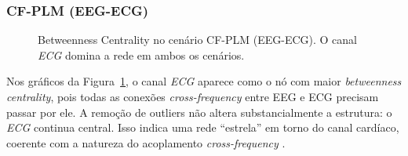 \subsubsection{CF-PLM (EEG-ECG)}
\begin{figure}[htb]
    \centering
    \quad
    \caption{Betweenness Centrality no cenário CF-PLM (EEG-ECG). O canal \emph{ECG} domina a rede em ambos os cenários.}
    \label{fig:bc_cfplm_eegecg}
\end{figure}

Nos gráficos da Figura~\ref{fig:bc_cfplm_eegecg}, o canal \emph{ECG} aparece como o nó com maior \emph{betweenness centrality}, pois todas as conexões \emph{cross-frequency} entre EEG e ECG precisam passar por ele. A remoção de outliers não altera substancialmente a estrutura: o \emph{ECG} continua central. Isso indica uma rede “estrela” em torno do canal cardíaco, coerente com a natureza do acoplamento \emph{cross-frequency} \cite{bullmore2009complex}.

